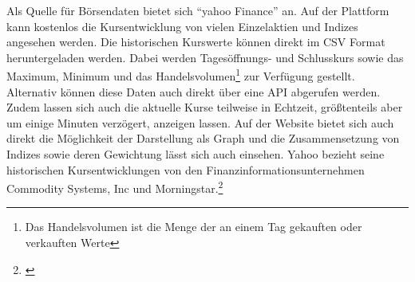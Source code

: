
Als Quelle für Börsendaten bietet sich \enquote{yahoo Finance} an. Auf der Plattform kann kostenlos die Kursentwicklung von vielen Einzelaktien und Indizes angesehen werden. Die historischen Kurswerte können direkt im \gls{CSV} Format heruntergeladen werden. Dabei werden Tagesöffnungs- und Schlusskurs sowie das Maximum, Minimum und das Handelsvolumen\footnote{Das Handelsvolumen ist die Menge der an einem Tag gekauften oder verkauften Werte} zur Verfügung gestellt. Alternativ können diese Daten auch direkt über eine \gls{API} abgerufen werden. Zudem lassen sich auch die aktuelle Kurse teilweise in Echtzeit, größtenteils aber um einige Minuten verzögert, anzeigen lassen. Auf der Website bietet sich auch direkt die Möglichkeit der Darstellung als Graph und die Zusammensetzung von Indizes sowie deren Gewichtung lässt sich auch einsehen. Yahoo bezieht seine historischen Kursentwicklungen von den Finanzinformationsunternehmen Commodity Systems, Inc und Morningstar.\footnote{\cite[Vgl.][]{YahooFinanceSources}}

\clearpage